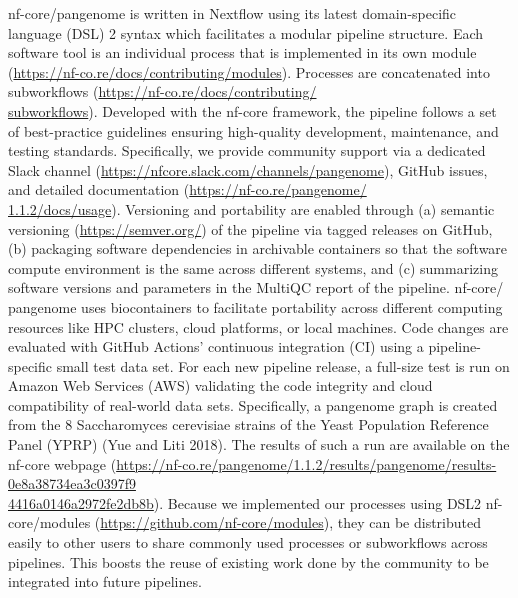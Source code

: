 \documentclass{bioinfo}
\theoremstyle{definition}
\begin{document}
	nf-core/pangenome is written in Nextflow using its latest domain-specific language (DSL) 2 syntax which facilitates a modular pipeline structure. 
	Each software tool is an individual process that is implemented in its own module (\href{https://nf-co.re/docs/contributing/modules}{https://nf-co.re/docs/contributing/modules}). 
	Processes are concatenated into subworkflows (\href{https://nf-co.re/docs/contributing/subworkflows}{https://nf-co.re/docs/contributing/\\subworkflows}). 
	Developed with the nf-core framework, the pipeline follows a set of best-practice guidelines ensuring high-quality development, maintenance, and testing standards. Specifically, we provide community support via a dedicated Slack channel (\href{https://nfcore.slack.com/channels/pangenome}{https://nfcore.slack.com/channels/pangenome}), GitHub issues, and detailed documentation (\href{https://nf-co.re/pangenome/1.1.2/docs/usage}{https://nf-co.re/pangenome/\\1.1.2/docs/usage}).
	Versioning and portability are enabled through (a) semantic versioning (\href{https://semver.org/}{https://semver.org/}) of the pipeline via tagged releases on GitHub, (b) packaging software dependencies in archivable containers so that the software compute environment is the same across different systems, and (c) summarizing software versions and parameters in the MultiQC report of the pipeline. 
	nf-core/ pangenome uses biocontainers to facilitate portability across different computing resources like HPC clusters, cloud platforms, or local machines. 
	Code changes are evaluated with GitHub Actions’ continuous integration (CI) using a pipeline-specific small test data set. 
	For each new pipeline release, a full-size test is run on Amazon Web Services (AWS) validating the code integrity and cloud compatibility of real-world data sets.
	Specifically, a pangenome graph is created from the 8 Saccharomyces cerevisiae strains of the Yeast Population Reference Panel (YPRP) (Yue and Liti 2018). 
	The results of such a run are available on the nf-core webpage (\href{https://nf-co.re/pangenome/1.1.2/results/pangenome/results-0e8a38734ea3c0397f94416a0146a2972fe2db8b}{https://nf-co.re/pangenome/1.1.2/results/pangenome/results-0e8a38734ea3c0397f9\\4416a0146a2972fe2db8b}). 
	Because we implemented our processes using DSL2 nf-core/modules (\href{https://github.com/nf-core/modules}{https://github.com/nf-core/modules}), they can be distributed easily to other users to share commonly used processes or subworkflows across pipelines. This boosts the reuse of existing work done by the community to be integrated into future pipelines.
	
\end{document}
